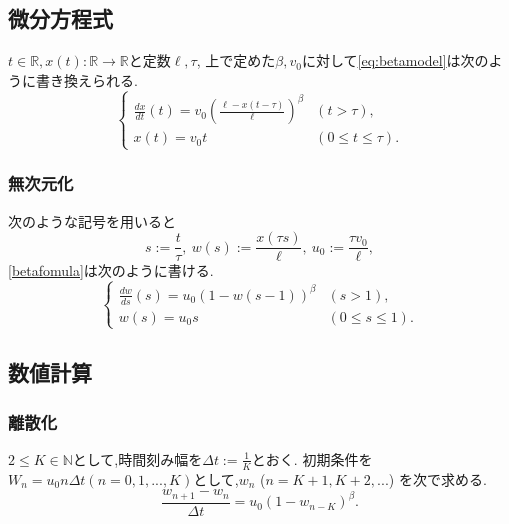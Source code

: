 \documentclass [dvipdfmx] {jsarticle}
\numberwithin{equation}{section}
\theoremstyle{definition} %
\theoremstyle{definition} %
\begin{document}


\subsection{微分方程式}
$t\in\mathbb{R},x(t)\colon\mathbb{R}\rightarrow\mathbb{R}$と定数$\ell,\tau$,
上で定めた$\beta,v_0$に対して\eqref{eq:betamodel}は次のように書き換えられる.
\begin{equation}\label{betafomula}\begin{cases}
    \displaystyle\frac{dx}{dt}(t)=v_0\left(\frac{\ell-x(t-\tau)}{\ell}\right)^\beta &(t>\tau),\\
    x(t)=v_0 t &(0\le t \le \tau).
\end{cases}\end{equation}


\subsubsection{無次元化}
次のような記号を用いると
\begin{equation}
    s:=\frac{t}{\tau},\ w(s):=\frac{x(\tau s)}{\ell},\ u_0:=\frac{\tau v_0}{\ell},
\end{equation}
\eqref{betafomula}は次のように書ける.
\begin{equation}\label{betafomula2}\begin{cases}
    \displaystyle\frac{dw}{ds}(s)=u_0(1-w(s-1))^\beta &(s>1),\\
    w(s)=u_0 s &(0\le s \le 1).
\end{cases}\end{equation}


\subsection{数値計算}
\subsubsection{離散化}
$2\le K\in\mathbb{N}$として,時間刻み幅を$\Delta t:=\frac{1}{K}$とおく.
初期条件を$W_n=u_0n\Delta t (n=0,1,...,K)$として,$w_n $ ($n=K+1,K+2,...$)
を次で求める.
\begin{equation}
    \displaystyle\frac{w_{n+1}-w_n}{\Delta t}=u_0(1-w_{n-K})^\beta.
\end{equation}
\end{document}
